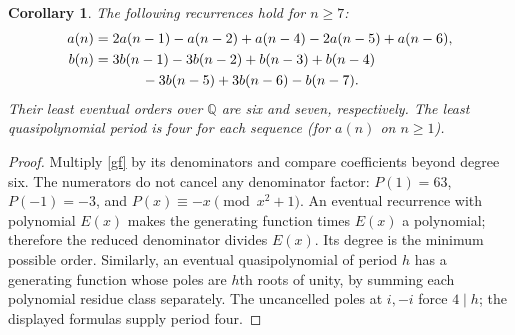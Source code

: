 \documentclass[11pt]{article}
\newtheorem{corollary}[theorem]{Corollary}
\begin{document}
\begin{corollary}\label{recurrences}
The following recurrences hold for $n\ge7$:
\begin{align*}
a(n)&=2a(n-1)-a(n-2)+a(n-4)-2a(n-5)+a(n-6),\\
b(n)&=3b(n-1)-3b(n-2)+b(n-3)+b(n-4)\\
&\hspace{12mm}-3b(n-5)+3b(n-6)-b(n-7).
\end{align*}
Their least eventual orders over $\mathbb Q$ are six and seven,
respectively. The least quasipolynomial period is four for each sequence
(for $a(n)$ on $n\ge1$).
\end{corollary}
\begin{proof}
Multiply \eqref{gf} by its denominators and compare coefficients beyond
degree six. The numerators do not cancel any denominator factor:
$P(1)=63$, $P(-1)=-3$, and $P(x)\equiv-x\pmod{x^2+1}$.
An eventual recurrence with polynomial $E(x)$ makes the generating
function times $E(x)$ a polynomial; therefore the reduced denominator
divides $E(x)$. Its degree is the minimum possible order.
Similarly, an eventual quasipolynomial of period $h$ has a generating
function whose poles are $h$th roots of unity, by summing each polynomial
residue class separately. The uncancelled poles at $i,-i$ force $4\mid h$;
the displayed formulas supply period four.
\end{proof}
\end{document}
